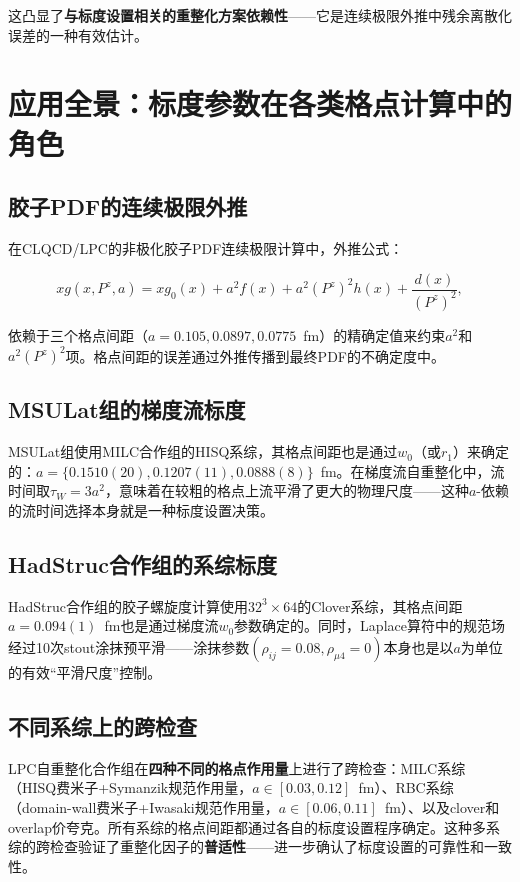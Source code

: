 \documentclass[12pt,a4paper]{ctexart}
\theoremstyle{definition}
\begin{document}
这凸显了\textbf{与标度设置相关的重整化方案依赖性}——它是连续极限外推中残余离散化误差的一种有效估计。

\section{应用全景：标度参数在各类格点计算中的角色}

\subsection{胶子PDF的连续极限外推}

在CLQCD/LPC的非极化胶子PDF连续极限计算中\cite{Chen2025gluon}，外推公式：

\begin{equation}
xg(x, P^z, a) = xg_0(x) + a^2 f(x) + a^2 (P^z)^2 h(x) + \frac{d(x)}{(P^z)^2},
\end{equation}

依赖于三个格点间距（$a = 0.105, 0.0897, 0.0775$~fm）的精确定值来约束$a^2$和$a^2(P^z)^2$项。格点间距的误差通过外推传播到最终PDF的不确定度中。

\subsection{MSULat组的梯度流标度}

MSULat组\cite{NieMiera2025}使用MILC合作组的HISQ系综，其格点间距也是通过$w_0$（或$r_1$）来确定的：$a = \{0.1510(20), 0.1207(11), 0.0888(8)\}$~fm。在梯度流自重整化中，流时间取$\tau_W = 3a^2$，意味着在较粗的格点上流平滑了更大的物理尺度——这种$a$-依赖的流时间选择本身就是一种标度设置决策。

\subsection{HadStruc合作组的系综标度}

HadStruc合作组的胶子螺旋度计算\cite{Egerer2022}使用$32^3 \times 64$的Clover系综，其格点间距$a = 0.094(1)$~fm也是通过梯度流$w_0$参数确定的。同时，Laplace算符中的规范场经过10次stout涂抹预平滑——涂抹参数$(\rho_{ij}=0.08, \rho_{\mu4}=0)$本身也是以$a$为单位的有效``平滑尺度''控制。

\subsection{不同系综上的跨检查}

LPC自重整化合作组\cite{Huo2021self}在\textbf{四种不同的格点作用量}上进行了跨检查：MILC系综（HISQ费米子+Symanzik规范作用量，$a \in [0.03, 0.12]$~fm）、RBC系综（domain-wall费米子+Iwasaki规范作用量，$a \in [0.06, 0.11]$~fm）、以及clover和overlap价夸克。所有系综的格点间距都通过各自的标度设置程序确定。这种多系综的跨检查验证了重整化因子的\textbf{普适性}——进一步确认了标度设置的可靠性和一致性。
\end{document}
